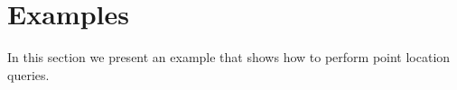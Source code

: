 
\section{Examples\label{sec:vda2-examples}}

In this section we present an example that shows how to perform point
location queries.

%

